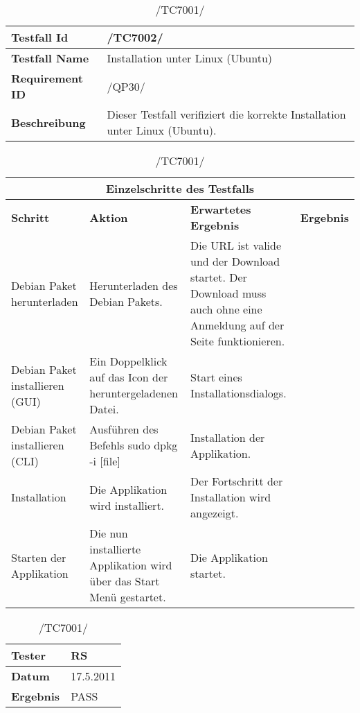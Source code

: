 \begin{table}[h]
\caption{/TC7001/}
\label{tab:TC7001}
\begin{center}
\begin{tabular}{|p{3.5cm}|p{11cm}|}
\hline
\textbf{Testfall Id} & /TC7002/\\
\hline
\textbf{Testfall Name} & Installation unter Linux (Ubuntu)\\
\hline
\textbf{Requirement ID} & /QP30/\\
\hline
\textbf{Beschreibung} & Dieser Testfall verifiziert die korrekte Installation unter Linux (Ubuntu).\\
\hline
\end{tabular}
\begin{tabular}{|p{2cm}|p{3.9cm}|p{3.9cm}|p{3.8cm}|}
\multicolumn{4}{|c|}{\textbf{Einzelschritte des Testfalls}} \\
\hline
\textbf{Schritt} & \textbf{Aktion} & \textbf{Erwartetes Ergebnis} & \textbf{Ergebnis}\\
\hline
Debian Paket herunterladen & Herunterladen des Debian Pakets. & Die URL ist valide und der Download startet. Der Download muss auch ohne eine Anmeldung auf der Seite funktionieren.\\
\hline
Debian Paket installieren (GUI) & Ein Doppelklick auf das Icon der heruntergeladenen Datei. & Start eines Installationsdialogs. \\
\hline
Debian Paket installieren (CLI) & Ausführen des Befehls sudo dpkg -i [file] & Installation der Applikation.\\
\hline
Installation & Die Applikation wird installiert. & Der Fortschritt der Installation wird angezeigt. \\
\hline
Starten der Applikation & Die nun installierte Applikation wird über das Start Menü gestartet. & Die Applikation startet. \\
\hline
\end{tabular}
\begin{tabular}{|p{3.5cm}|p{11cm}|}
\textbf{Tester} & RS\\
\hline
\textbf{Datum} & 17.5.2011\\
\hline
\textbf{Ergebnis} & PASS\\
\hline
\end{tabular}
\end{center}
\label{default}
\end{table}